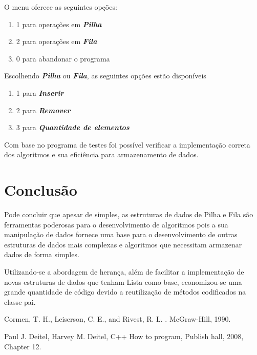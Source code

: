\documentclass[rascunho,xindy,sublist]{fei}
\begin{document}
O menu oferece as seguintes opções:

\begin{enumerate}
  \item 1 para operações em \textbf{\textit{Pilha}}
  \item 2 para operações em \textbf{\textit{Fila}}
  \item 0 para abandonar o programa
\end{enumerate}

Escolhendo \textbf{\textit{Pilha}} ou \textbf{\textit{Fila}}, as seguintes opções estão disponíveis

\begin{enumerate}
  \item 1 para \textbf{\textit{Inserir}}
  \item 2 para \textbf{\textit{Remover}}
  \item 3 para \textbf{\textit{Quantidade de elementos}}
\end{enumerate}

Com base no programa de testes foi possível verificar a implementação correta dos algoritmos e sua eficiência para armazenamento de dados.

\chapter{Conclusão}

Pode concluir que apesar de simples, as estruturas de dados de Pilha e Fila são ferramentas poderosas para o desenvolvimento de algoritmos pois a sua manipulação de dados fornece uma base para o desenvolvimento de outras estruturas de dados mais complexas e algoritmos que necessitam armazenar dados de forma simples.

Utilizando-se a abordagem de herança, além de facilitar a implementação de novas estruturas de dados que tenham Lista como base, economizou-se uma grande quantidade de código devido a reutilização de métodos codificados na classe pai.


\printindex

\begin{thebibliography}{9}

{Cormen, T. H.}, {Leiserson, C. E.}, and {Rivest, R. L.}
.
\newblock McGraw-Hill, 1990.

 Paul J. Deitel, Harvey M. Deitel, C++ How to program, Publish hall, 2008, Chapter 12.

\end{thebibliography}
\end{document}
